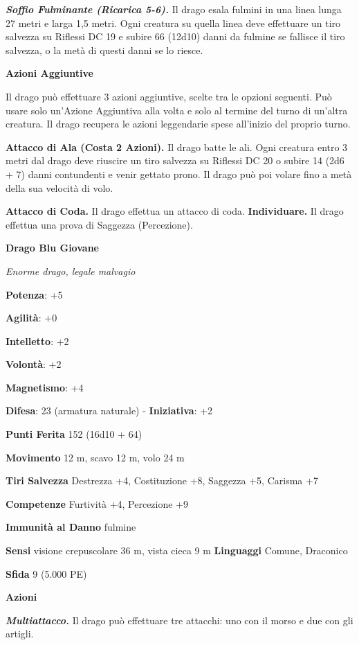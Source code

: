 \begin{multicols}{2}
\emph{\textbf{Soffio Fulminante (Ricarica 5-6).}} Il drago esala fulmini
in una linea lunga 27 metri e larga 1,5 metri. Ogni creatura su quella
linea deve effettuare un tiro salvezza su Riflessi DC 19 e subire 66
(12d10) danni da fulmine se fallisce il tiro salvezza, o la metà di
questi danni se lo riesce.

\textbf{Azioni Aggiuntive}

Il drago può effettuare 3 azioni aggiuntive, scelte tra le opzioni
seguenti. Può usare solo un'Azione Aggiuntiva alla volta e solo al
termine del turno di un'altra creatura. Il drago recupera le azioni
leggendarie spese all'inizio del proprio turno.

\textbf{Attacco di Ala (Costa 2 Azioni).} Il drago batte le ali. Ogni
creatura entro 3 metri dal drago deve riuscire un tiro salvezza su Riflessi DC 20 o subire 14 (2d6 + 7) danni contundenti e venir gettato
prono. Il drago può poi volare fino a metà della sua velocità di volo.

\textbf{Attacco di Coda.} Il drago effettua un attacco di coda.
\textbf{Individuare.} Il drago effettua una prova di Saggezza
(Percezione).

\textbf{Drago Blu Giovane}

\emph{Enorme drago, legale malvagio}

\textbf{Potenza}: +5

\textbf{Agilità}: +0

\textbf{Intelletto}: +2

\textbf{Volontà}: +2

\textbf{Magnetismo}: +4

\textbf{Difesa}: 23 (armatura naturale) - \textbf{Iniziativa}: +2

\textbf{Punti Ferita} 152 (16d10 + 64)

\textbf{Movimento} 12 m, scavo 12 m, volo 24 m

\textbf{Tiri Salvezza} Destrezza +4, Costituzione +8, Saggezza +5,
Carisma +7

\textbf{Competenze} Furtività +4, Percezione +9

\textbf{Immunità al Danno} fulmine

\textbf{Sensi} visione crepuscolare 36 m, vista cieca 9 m
\textbf{Linguaggi} Comune, Draconico

\textbf{Sfida} 9 (5.000 PE)

\textbf{Azioni}

\emph{\textbf{Multiattacco.}} Il drago può effettuare tre attacchi: uno
con il morso e due con gli artigli.


\end{multicols}
